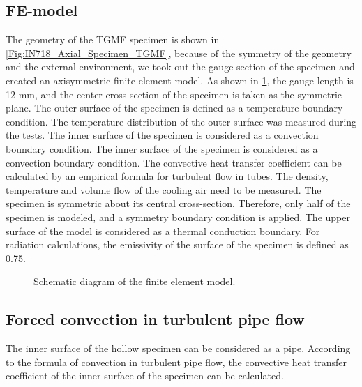 \subsection{FE-model}
\noindent
The geometry of the TGMF specimen is shown in \ref{Fig:IN718_Axial_Specimen_TGMF}, because of the symmetry of the geometry and the external environment, we took out the gauge section of the specimen and created an axisymmetric finite element model. As shown in \ref{Fig:FE_model}, the gauge length is 12 mm, and the center cross-section of the specimen is taken as the symmetric plane.
The outer surface of the specimen is defined as a temperature boundary condition. The temperature distribution of the outer surface was measured during the tests. The inner surface of the specimen is considered as a convection boundary condition. The inner surface of the specimen is considered as a convection boundary condition. The convective heat transfer coefficient can be calculated by an empirical formula for turbulent flow in tubes. The density, temperature and volume flow of the cooling air need to be measured. The specimen is symmetric about its central cross-section. Therefore, only half of the specimen is modeled, and a symmetry boundary condition is applied.
The upper surface of the model is considered as a thermal conduction boundary. For radiation calculations, the emissivity of the surface of the specimen is defined as 0.75.

\begin{figure}[!htp]
  \caption{Schematic diagram of the finite element model.}
  \label{Fig:FE_model}
\end{figure}

\subsection{Forced convection in turbulent pipe flow}
The inner surface of the hollow specimen can be considered as a pipe.
According to the formula of convection in turbulent pipe flow, the convective heat transfer coefficient of the inner surface of the specimen can be calculated.

